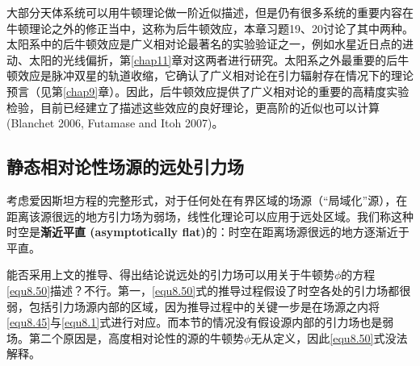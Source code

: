大部分天体系统可以用牛顿理论做一阶近似描述，但是仍有很多系统的重要内容在牛顿理论之外的修正当中，这称为后牛顿效应，本章习题19、20讨论了其中两种。太阳系中的后牛顿效应是广义相对论最著名的实验验证之一，例如水星近日点的进动、太阳的光线偏折，第\ref{chap11}章对这两者进行研究。太阳系之外最重要的后牛顿效应是脉冲双星的轨道收缩，它确认了广义相对论在引力辐射存在情况下的理论预言（见第\ref{chap9}章）。因此，后牛顿效应提供了广义相对论的重要的高精度实验检验，目前已经建立了描述这些效应的良好理论，更高阶的近似也可以计算(Blanchet 2006, Futamase and
Itoh 2007)。

\subsection*{静态相对论性场源的远处引力场}
考虑爱因斯坦方程的完整形式，对于任何处在有界区域的场源（“局域化”源），在距离该源很远的地方引力场为弱场，线性化理论可以应用于远处区域。我们称这种时空是\textbf{渐近平直 (asymptotically flat)}的：时空在距离场源很远的地方逐渐近于平直。

能否采用上文的推导、得出结论说远处的引力场可以用关于牛顿势$\phi$的方程\eqref{equ8.50}描述？不行。第一，\eqref{equ8.50}式的推导过程假设了时空各处的引力场都很弱，包括引力场源内部的区域，因为推导过程中的关键一步是在场源之内将\eqref{equ8.45}与\eqref{equ8.1}式进行对应。而本节的情况没有假设源内部的引力场也是弱场。第二个原因是，高度相对论性的源的牛顿势$\phi$无从定义，因此\eqref{equ8.50}式没法解释。


